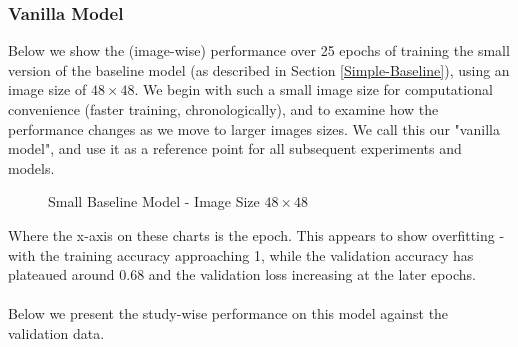 \documentclass[11pt]{article} %
\theoremstyle{plain}
\theoremstyle{definition}
\begin{document}
\subsubsection{Vanilla Model}
Below we show the (image-wise) performance over 25 epochs of training the small version of the baseline model (as described in Section \ref{Simple-Baseline}), using an image size of \(48 \times 48\). We begin with such a small image size for computational convenience (faster training, chronologically), and to examine how the performance changes as we move to larger images sizes. We call this our "vanilla model", and use it as a reference point for all subsequent experiments and models.
\begin{figure}[!ht]
\centering
{}
\newline
{}
\caption{Small Baseline Model - Image Size \(48 \times 48\) }
\label{fig:Results_Vanilla}
\end{figure}
\FloatBarrier
\noindent
Where the x-axis on these charts is the epoch. This appears to show overfitting - with the training accuracy approaching 1, while the validation accuracy has plateaued around 0.68 and the validation loss increasing at the later epochs.
\\
\\
\noindent
Below we present the study-wise performance on this model against the validation data.
\end{document}

